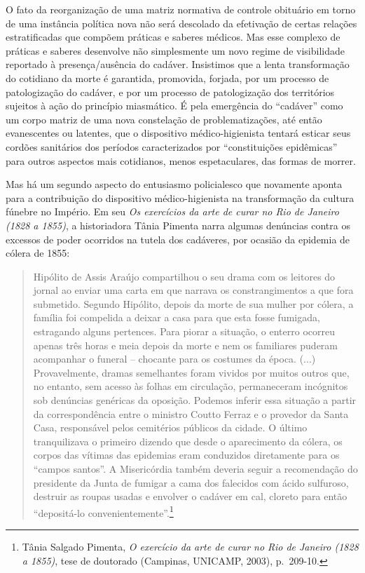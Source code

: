 O fato da reorganização de uma matriz normativa de controle obituário em
torno de uma instância política nova não será descolado da efetivação de
certas relações estratificadas que compõem práticas e saberes médicos.
Mas esse complexo de práticas e saberes desenvolve não simplesmente um
novo regime de visibilidade reportado à presença/ausência do cadáver.
Insistimos que a lenta transformação do cotidiano da morte é garantida,
promovida, forjada, por um processo de patologização do cadáver, e por
um processo de patologização dos territórios sujeitos à ação do
princípio miasmático. É pela emergência do ``cadáver'' como um corpo
matriz de uma nova constelação de problematizações, até então
evanescentes ou latentes, que o dispositivo médico-higienista tentará
esticar seus cordões sanitários dos períodos caracterizados por
``constituições epidêmicas'' para outros aspectos mais cotidianos, menos
espetaculares, das formas de morrer.

Mas há um segundo aspecto do entusiasmo policialesco que novamente
aponta para a contribuição do dispositivo médico-higienista na
transformação da cultura fúnebre no Império. Em seu \emph{Os exercícios
da arte de curar no Rio de Janeiro (1828 a 1855)}, a historiadora Tânia
Pimenta narra algumas denúncias contra os excessos de poder ocorridos na
tutela dos cadáveres, por ocasião da epidemia de cólera de 1855:

\begin{quote}
Hipólito de Assis Araújo compartilhou o seu drama com os leitores do
jornal ao enviar uma carta em que narrava os constrangimentos a que fora
submetido. Segundo Hipólito, depois da morte de sua mulher por cólera, a
família foi compelida a deixar a casa para que esta fosse fumigada,
estragando alguns pertences. Para piorar a situação, o enterro ocorreu
apenas três horas e meia depois da morte e nem os familiares puderam
acompanhar o funeral -- chocante para os costumes da época. (...)
Provavelmente, dramas semelhantes foram vividos por muitos outros que,
no entanto, sem acesso às folhas em circulação, permaneceram incógnitos
sob denúncias genéricas da oposição. Podemos inferir essa situação a
partir da correspondência entre o ministro Coutto Ferraz e o provedor da
Santa Casa, responsável pelos cemitérios públicos da cidade. O último
tranquilizava o primeiro dizendo que desde o aparecimento da cólera, os
corpos das vítimas das epidemias eram conduzidos diretamente para os
``campos santos''. A Misericórdia também deveria seguir a recomendação
do presidente da Junta de fumigar a cama dos falecidos com ácido
sulfuroso, destruir as roupas usadas e envolver o cadáver em cal,
cloreto para então ``depositá-lo convenientemente''.\footnote{Tânia
  Salgado Pimenta, \emph{O exercício da arte de curar no Rio de Janeiro
  (1828 a 1855)}, tese de doutorado (Campinas, UNICAMP, 2003),
  p.~209-10.}
\end{quote}

